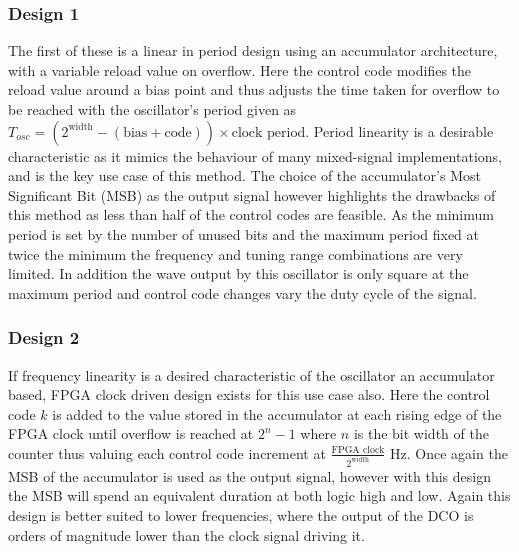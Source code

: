 \documentclass[conference]{IEEEtran}
\begin{document}
\subsubsection*{Design 1}
The first of these is a linear in period design using an accumulator architecture, with a variable reload value on overflow. Here the control code modifies the reload value around a bias point and thus adjusts the time taken for overflow to be reached with the oscillator's period given as $T_{osc} = (2^{\textrm{width}} - (\textrm{bias}+\textrm{code}))\times\textrm{clock period}$. Period linearity is a desirable characteristic as it mimics the behaviour of many mixed-signal implementations, and is the key use case of this method. The choice of the accumulator's Most Significant Bit (MSB) as the output signal however highlights the drawbacks of this method as less than half of the control codes are feasible. As the minimum period is set by the number of unused bits and the maximum period fixed at twice the minimum the frequency and tuning range combinations are very limited.
In addition the wave output by this oscillator is only square at the maximum period and control code changes vary the duty cycle of the signal.

\subsubsection*{Design 2}
If frequency linearity is a desired characteristic of the oscillator an accumulator based, FPGA clock driven design exists for this use case also. 
Here the control code $k$ is added to the value stored in the accumulator at each rising edge of the FPGA clock until overflow is reached at $2^n-1$ where $n$ is the bit width of the counter thus valuing each control code increment at $\frac{\textrm{FPGA clock}}{2^{\textrm{width}}}$ Hz. Once again the MSB of the accumulator is used as the output signal, however with this design the MSB will spend an equivalent duration at both logic high and low.
Again this design is better suited to lower frequencies, where the output of the DCO is orders of magnitude lower than the clock signal driving it.
\end{document}
